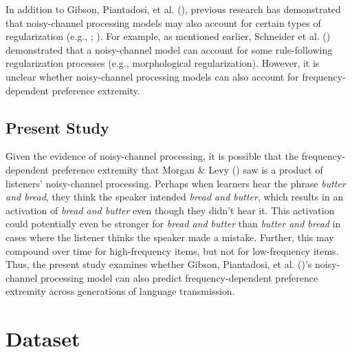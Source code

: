 \documentclass[
  12pt,
  letterpaper,
]{scrreport}
\begin{document}
In addition to Gibson, Piantadosi, et al.
(),
previous research has demonstrated that noisy-channel processing models
may also account for certain types of regularization (e.g.,
; ). For example, as mentioned earlier, Schneider et al.
() demonstrated that
a noisy-channel model can account for some rule-following regularization
processes (e.g., morphological regularization). However, it is unclear
whether noisy-channel processing models can also account for
frequency-dependent preference extremity.

\subsection{Present Study}\label{present-study-3}

Given the evidence of noisy-channel processing, it is possible that the
frequency-dependent preference extremity that Morgan \& Levy
()
saw is a product of listeners' noisy-channel processing. Perhaps when
learners hear the phrase \emph{butter and bread}, they think the speaker
intended \emph{bread and butter}, which results in an activation of
\emph{bread and butter} even though they didn't hear it. This activation
could potentially even be stronger for \emph{bread and butter} than
\emph{butter and bread} in cases where the listener thinks the speaker
made a mistake. Further, this may compound over time for high-frequency
items, but not for low-frequency items. Thus, the present study examines
whether Gibson, Piantadosi, et al.
()'s
noisy-channel processing model can also predict frequency-dependent
preference extremity across generations of language transmission.

\section{Dataset}\label{dataset-2}
\end{document}
